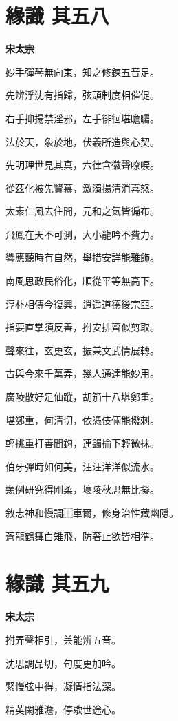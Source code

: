 \documentclass[12pt,a4paper]{ctexbook}
\begin{document}
\section{緣識  其五八}
\textbf{宋太宗}\par\vspace{0.5em}
妙手彈琴無向束，知之修鍊五音足。\par
先辨浮沈有指歸，弦頭制度相催促。\par
右手抑揚禁淫邪，左手徘徊堪瞻矚。\par
法於天，象於地，伏羲所造與心契。\par
先明理世見其真，六律含徽聲嘹唳。\par
從茲化被先賢慕，激濁揚清消喜怒。\par
太素仁風去住間，元和之氣皆徧布。\par
飛鳳在天不可測，大小龍吟不費力。\par
響應聽時有自然，舉措安詳能雅飾。\par
南風思政民俗化，順從平等無高下。\par
淳朴相傳今復興，逍遥道德後宗亞。\par
指要直掌須反善，拊安排齊似剪取。\par
聲來往，玄更玄，振兼文武情展轉。\par
古與今來千萬弄，幾人通達能妙用。\par
廣陵散好足仙蹤，胡笳十八堪鄭重。\par
堪鄭重，何清切，依憑伎倆能撥剌。\par
輕挑重打善間鉤，連蠲掄下輕微抹。\par
伯牙彈時如何美，汪汪洋洋似流水。\par
類例研究得剛柔，壞陵秋思無比擬。\par
敘志神和慢調⿰車爾，修身治性藏幽隠。\par
蒼龍鶴舞白雉飛，防奢止欲皆相準。\par

\section{緣識  其五九}
\textbf{宋太宗}\par\vspace{0.5em}
拊弄聲相引，兼能辨五音。\par
沈思調品切，句度更加吟。\par
緊慢弦中得，凝情指法深。\par
精英閑雅澹，停歇世途心。\par
\end{document}
